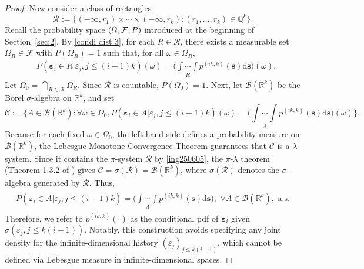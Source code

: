 \documentclass[ejsv2]{imsart}
\theoremstyle{plain}
\theoremstyle{definition}
\theoremstyle{remark}
\begin{document}
\begin{proof}
Now consider a class of rectangles
$$\mathcal{R}:=\{(-\infty,r_1)\times\cdots\times(-\infty,r_k):(r_1,\ldots,r_k)\in\mathbb{Q}^k\}.$$
Recall the probability space $(\Omega, {\cal F}, P)$ introduced at the beginning of Section~\ref{sec:2}. By \eqref{condi dist 3}, for each $R\in\mathcal{R}$, there exists a measurable set $\Omega_R\in\mathcal{F}$ with $P(\Omega_R)=1$ such that, for all $\omega\in\Omega_R$,
\begin{equation}
\label{ing250605}
\begin{split}
    & P(\bm{\varepsilon}_i\in R |\varepsilon_j,j\leq (i-1)k)(\omega) = \bigg(\underset{R}{\int\cdots\int}p^{(ik, k)}(\mathbf{s})\mathrm{d}\mathbf{s}\bigg)(\omega).
\end{split}
\end{equation}
Let $\Omega_0=\bigcap_{R\in\mathcal{R}}\Omega_R$. Since $\mathcal{R}$ is countable, $P(\Omega_0)=1$.
Next, 
let
$\mathcal{B}(\mathbb{R}^k)$ be the Borel $\sigma$-algebra on $\mathbb{R}^k$, and set
$$\mathcal{C}:=\{A\in \mathcal{B}(\mathbb{R}^k):
\forall \omega\in\Omega_0,
P(\bm{\varepsilon}_i\in A|\varepsilon_j,j\leq (i-1)k)(\omega)=\bigg(\underset{A}{\int\cdots\int}p^{(ik, k)}(\mathbf{s})\mathrm{d}\mathbf{s}\bigg)(\omega)
\}.$$
Because for each fixed  $\omega\in\Omega_0$,
the left-hand side defines a probability measure on 
$\mathcal{B}(\mathbb{R}^k)$,
the Lebesgue Monotone Convergence Theorem guarantees that
$\mathcal{C}$ is a $\lambda$-system. Since it contains the $\pi$-system $\mathcal{R}$
by \eqref{ing250605}, 
the $\pi$-$\lambda$ theorem
(Theorem 1.3.2 of 
\cite{Chow1997}) gives
$\mathcal{C}= \sigma(\mathcal{R})=\mathcal{B}(\mathbb{R}^k)$, where 
$\sigma(\mathcal{R})$ denotes the $\sigma$-algebra
generated by $\mathcal{R}$.
Thus,
\begin{align}
\label{ing250602}
\begin{split}
P(\bm{\varepsilon}_i\in A|\varepsilon_j,j\leq (i-1)k)=\bigg(\underset{A}{\int\cdots\int}p^{(ik, k)}(\mathbf{s})\mathrm{d}\mathbf{s}\bigg),\,\,
\forall A\in \mathcal{B}(\mathbb{R}^k),
\,\,\mbox{a.s.}
\end{split}
\end{align}
Therefore,
we refer to $p^{(ik,k)}(\cdot)$
as the conditional pdf of
 $\bm{\varepsilon}_i$ given $\sigma(\varepsilon_j,j\leq k(i-1))$.
 Notably, this construction avoids specifying any joint density for the infinite-dimensional history
$(\varepsilon_j)_{j\leq k(i-1)}$,
which cannot be defined via Lebesgue measure in infinite-dimensional spaces.



\end{proof}
\end{document}
